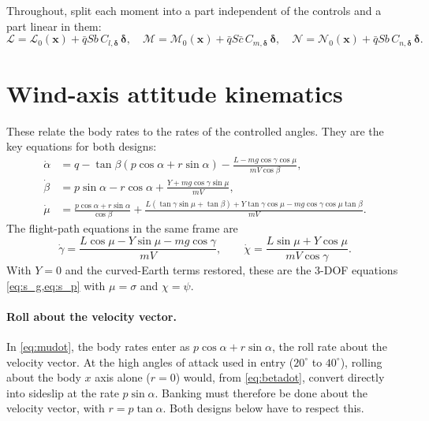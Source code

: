 \documentclass[11pt]{report}
\numberwithin{equation}{chapter}
\newcommand{\vb}[1]{\bm{#1}}
\begin{document}
Throughout, split each moment into a part independent of the controls and a part linear in
them:
\begin{equation}
  \mathcal L = \mathcal L_0(\vb x) + \bar q S b\, C_{l,\vb\delta}\,\vb\delta,\quad
  \mathcal M = \mathcal M_0(\vb x) + \bar q S \bar c\, C_{m,\vb\delta}\,\vb\delta,\quad
  \mathcal N = \mathcal N_0(\vb x) + \bar q S b\, C_{n,\vb\delta}\,\vb\delta .
  \label{eq:moment_split}
\end{equation}

\section{Wind-axis attitude kinematics}

These relate the body rates to the rates of the controlled angles. They are the key
equations for both designs:
\begin{align}
  \dot\alpha &= q - \tan\beta\left(p\cos\alpha + r\sin\alpha\right)
     - \frac{L - m g\cos\gamma\cos\mu}{m V\cos\beta}, \label{eq:alphadot}\\[4pt]
  \dot\beta &= p\sin\alpha - r\cos\alpha + \frac{Y + m g\cos\gamma\sin\mu}{m V}, \label{eq:betadot}\\[4pt]
  \dot\mu &= \frac{p\cos\alpha + r\sin\alpha}{\cos\beta}
     + \frac{L\left(\tan\gamma\sin\mu + \tan\beta\right) + Y\tan\gamma\cos\mu
             - m g\cos\gamma\cos\mu\tan\beta}{m V}. \label{eq:mudot}
\end{align}
The flight-path equations in the same frame are
\begin{equation}
  \dot\gamma = \frac{L\cos\mu - Y\sin\mu - m g\cos\gamma}{m V},\qquad
  \dot\chi = \frac{L\sin\mu + Y\cos\mu}{m V\cos\gamma} .
\end{equation}
With $Y=0$ and the curved-Earth terms restored, these are the 3-DOF equations
\cref{eq:s_g,eq:s_p} with $\mu = \sigma$ and $\chi = \psi$.

\paragraph{Roll about the velocity vector.} In \cref{eq:mudot}, the body rates enter as
$p\cos\alpha + r\sin\alpha$, the roll rate about the velocity vector. At the high angles of
attack used in entry ($20^\circ$ to $40^\circ$), rolling about the body $x$ axis alone
($r=0$) would, from \cref{eq:betadot}, convert directly into sideslip at the rate
$p\sin\alpha$. Banking must therefore be done about the velocity vector, with
$r = p\tan\alpha$. Both designs below have to respect this.
\end{document}
